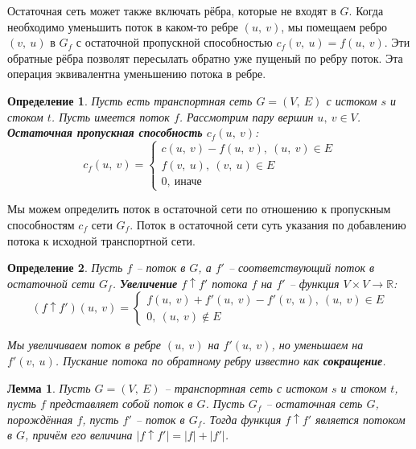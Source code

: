 \documentclass[a4paper,12pt]{article}
\newtheorem*{fulllemma}{Лемма}
\newtheorem*{definition}{Определение}
\newcommand{\R}{\mathbb{R}}
\begin{document}
Остаточная сеть может также включать рёбра, которые не входят в $G$. Когда необходимо уменьшить поток в каком-то ребре $(u,\ v)$, мы помещаем ребро $(v,\ u)$ в $G_f$ с остаточной пропускной способностью $c_f(v,\ u) = f(u,\ v)$. Эти обратные рёбра позволят пересылать обратно уже пущеный по ребру поток. Эта операция эквивалентна уменьшению потока в ребре.

\begin{definition}
    Пусть есть транспортная сеть $G = (V,\ E)$ с истоком $s$ и стоком $t$. Пусть имеется поток $f$. Рассмотрим пару вершин $u,\ v \in V$. \textbf{Остаточная пропускная способность} $c_f(u,\ v)$:\[c_f(u,\ v) = \begin{cases}c(u,\ v) - f(u,\ v),\ (u,\ v) \in E\\ f(v,\ u),\ (v,\ u) \in E\\ 0,\ \text{иначе}\end{cases}\]
\end{definition}

Мы можем определить поток в остаточной сети по отношению к пропускным способностям $c_f$ сети $G_f$. Поток в остаточной сети суть указания по добавлению потока к исходной транспортной сети.

\begin{definition}
    Пусть $f$ -- поток в $G$, а $f'$ -- соответствующий поток в остаточной сети $G_f$. \textbf{Увеличение} $f\uparrow f'$ потока $f$ на $f'$ -- функция $V\times V \to \R$: \[(f\uparrow f')(u,\ v) = \begin{cases} f(u,\ v) + f'(u,\ v) - f'(v,\ u),\ (u,\ v) \in E\\ 0,\ (u,\ v) \notin E\end{cases}\]
    
    Мы увеличиваем поток в ребре $(u,\ v)$ на $f'(u,\ v)$, но уменьшаем на $f'(v,\ u)$. Пускание потока по обратному ребру известно как \textbf{сокращение}.
\end{definition}

\begin{fulllemma}
Пусть $G = (V,\ E)$ -- транспортная сеть с истоком $s$ и стоком $t$, пусть $f$ представляет собой поток в $G$. Пусть $G_f$ -- остаточная сеть $G$, порождённая $f$, пусть $f'$ -- поток в $G_f$. Тогда функция $f\uparrow f'$ является потоком в $G$, причём его величина $|f\uparrow f'| = |f| + |f'|$.
\end{fulllemma}
\end{document}
